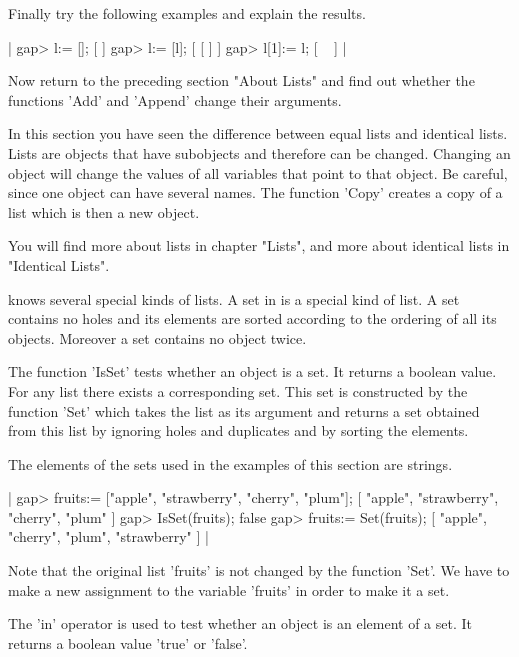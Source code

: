 Finally try the following examples and explain the results.

|    gap> l:= [];
    [  ]
    gap> l:= [l];
    [ [  ] ]
    gap> l[1]:= l;
    [ ~ ] |

Now return to the  preceding section  "About Lists" and  find out whether
the functions 'Add' and 'Append' change their arguments.

In this section you  have  seen the  difference between  equal lists  and
identical lists.  Lists are  objects  that have  subobjects and therefore
can  be  changed.  Changing an  object  will  change  the values  of  all
variables that point to  that object.  Be careful, since  one object  can
have several names.  The  function 'Copy' creates a copy of  a list which
is then a new object.

You  will find  more  about  lists  in chapter  "Lists",  and more  about
identical lists in "Identical Lists".


{\GAP}  knows  several  special kinds  of lists.   A set in  {\GAP}  is a
special kind  of  list.  A set contains no  holes  and  its  elements are
sorted according to  the {\GAP} ordering  of all its objects.  Moreover a
set contains no object twice.

The function  'IsSet'  tests whether an  object  is a set.  It returns  a
boolean value.  For any list there exists  a corresponding set.  This set
is constructed by the function 'Set' which takes the list as its argument
and  returns  a  set  obtained  from  this  list  by ignoring  holes  and
duplicates and by sorting the elements.

The  elements  of  the  sets used  in  the  examples of this  section are
strings.

|    gap> fruits:= ["apple", "strawberry", "cherry", "plum"];
    [ "apple", "strawberry", "cherry", "plum" ]
    gap> IsSet(fruits);
    false
    gap> fruits:= Set(fruits);
    [ "apple", "cherry", "plum", "strawberry" ] |

Note that  the  original list 'fruits'  is not  changed   by the function
'Set'.   We have to  make  a new assignment to   the variable 'fruits' in
order to make it a set.

The 'in' operator is  used  to test whether an  object is an element of a
set.  It returns a boolean value 'true' or 'false'.

